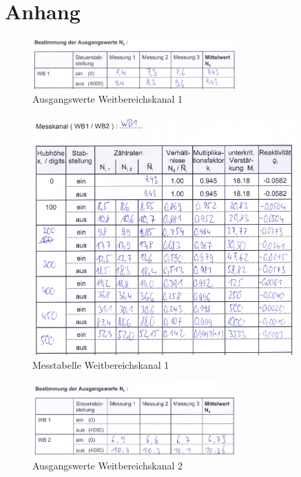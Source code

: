 \documentclass[12pt,german]{article}
\begin{document}
    \section{Anhang}
    \begin{figure}[H]
        \centering
        \includegraphics[width=0.7\textwidth]{ausgang_wb1.png}
        \caption{Ausgangswerte Weitbereichskanal 1}
    \end{figure}
    \begin{figure}[H]
        \centering
        \includegraphics[width=0.9\textwidth]{messtabelle_wb1.png}
        \caption{Messtabelle Weitbereichskanal 1}
    \end{figure}
    \begin{figure}[H]
        \centering
        \includegraphics[width=0.7\textwidth]{ausgang_wb2.png}
        \caption{Ausgangswerte Weitbereichskanal 2}
    \end{figure}
\end{document}
